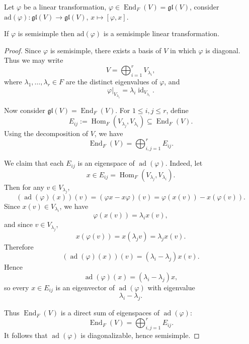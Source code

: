\begin{proposition}
    Let $\varphi$ be a linear transformation, $\varphi \in \operatorname{End}_F(V)=\mathfrak{gl}(V)$, consider $\mathrm{ad}(\varphi): \mathfrak{gl}(V) \to \mathfrak{gl}(V)$, $x \mapsto [\varphi, x]$.

    If $\varphi$ is semisimple then $\mathrm{ad}(\varphi)$ is a semisimple linear transformation.
\end{proposition}

\begin{proof}
    Since $\varphi$ is semisimple, there exists a basis of $V$ in which $\varphi$ is diagonal. Thus we may write
    \[
        V=\bigoplus_{i=1}^r V_{\lambda_i},
    \]
    where $\lambda_1,\dots,\lambda_r \in F$ are the distinct eigenvalues of $\varphi$, and
    \[
        \varphi|_{V_{\lambda_i}}=\lambda_i \operatorname{id}_{V_{\lambda_i}}.
    \]

    Now consider $\mathfrak{gl}(V)=\operatorname{End}_F(V)$. For $1\le i,j\le r$, define
    \[
        E_{ij}:=\operatorname{Hom}_F(V_{\lambda_j},V_{\lambda_i}) \subseteq \operatorname{End}_F(V).
    \]
    Using the decomposition of $V$, we have
    \[
        \operatorname{End}_F(V)
        =
        \bigoplus_{i,j=1}^r E_{ij}.
    \]

    We claim that each $E_{ij}$ is an eigenspace of $\operatorname{ad}(\varphi)$. Indeed, let
    \[
        x\in E_{ij}=\operatorname{Hom}_F(V_{\lambda_j},V_{\lambda_i}).
    \]
    Then for any $v\in V_{\lambda_j}$,
    \[
        (\operatorname{ad}(\varphi)(x))(v)
        =
        (\varphi x-x\varphi)(v)
        =
        \varphi(x(v))-x(\varphi(v)).
    \]
    Since $x(v)\in V_{\lambda_i}$, we have
    \[
        \varphi(x(v))=\lambda_i x(v),
    \]
    and since $v\in V_{\lambda_j}$,
    \[
        x(\varphi(v))=x(\lambda_j v)=\lambda_j x(v).
    \]
    Therefore
    \[
        (\operatorname{ad}(\varphi)(x))(v)
        =
        (\lambda_i-\lambda_j)x(v).
    \]
    Hence
    \[
        \operatorname{ad}(\varphi)(x)=(\lambda_i-\lambda_j)x,
    \]
    so every $x\in E_{ij}$ is an eigenvector of $\operatorname{ad}(\varphi)$ with eigenvalue
    \[
        \lambda_i-\lambda_j.
    \]

    Thus $\operatorname{End}_F(V)$ is a direct sum of eigenspaces of $\operatorname{ad}(\varphi)$:
    \[
        \operatorname{End}_F(V)
        =
        \bigoplus_{i,j=1}^r E_{ij}.
    \]
    It follows that $\operatorname{ad}(\varphi)$ is diagonalizable, hence semisimple.
\end{proof}

